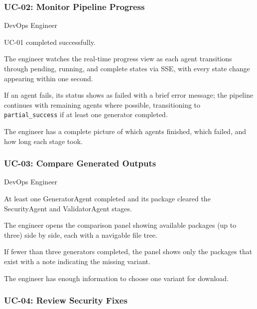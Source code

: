 \subsubsection*{UC-02: Monitor Pipeline Progress}

\begin{description}[leftmargin=3.5cm, style=nextline]
  \item[Actor] DevOps Engineer
  \item[Precondition] UC-01 completed successfully.
  \item[Main Flow] The engineer watches the real-time progress view as each
    agent transitions through pending, running, and complete states via SSE,
    with every state change appearing within one second.
  \item[Alternate Flow] If an agent fails, its status shows as failed with
    a brief error message; the pipeline continues with remaining agents
    where possible, transitioning to \texttt{partial\_success} if at least
    one generator completed.
  \item[Postcondition] The engineer has a complete picture of which agents
    finished, which failed, and how long each stage took.
\end{description}

\subsubsection*{UC-03: Compare Generated Outputs}

\begin{description}[leftmargin=3.5cm, style=nextline]
  \item[Actor] DevOps Engineer
  \item[Precondition] At least one GeneratorAgent completed and its package
    cleared the SecurityAgent and ValidatorAgent stages.
  \item[Main Flow] The engineer opens the comparison panel showing available
    packages (up to three) side by side, each with a navigable file tree.
  \item[Alternate Flow] If fewer than three generators completed, the panel
    shows only the packages that exist with a note indicating the missing
    variant.
  \item[Postcondition] The engineer has enough information to choose one
    variant for download.
\end{description}

\subsubsection*{UC-04: Review Security Fixes}

